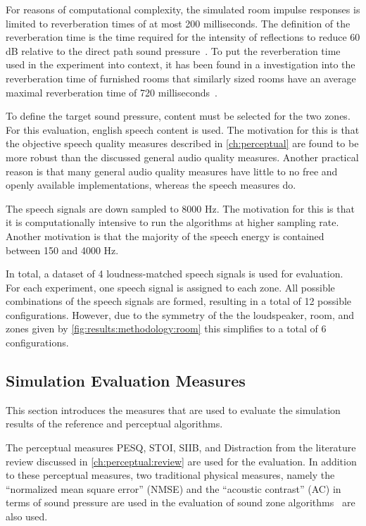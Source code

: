 For reasons of computational complexity, the simulated room impulse 
responses is limited to reverberation times of at most 200 milliseconds.
The definition of the reverberation time is the time required for the intensity of reflections to reduce 60 dB relative 
to the direct path sound pressure~\cite{habets2006room}. 
To put the reverberation time used in the experiment into context, 
it has been found in a investigation into the reverberation time of furnished rooms
that similarly sized rooms have an average maximal reverberation 
time of 720 milliseconds~\cite{diaz2005reverberation}.

To define the target sound pressure, content must be selected for the two zones.
For this evaluation, english speech content is used.
The motivation for this is that the objective speech quality measures described in 
\autoref{ch:perceptual} are found to be more robust than
the discussed general audio quality measures.
Another practical reason is that many general audio quality measures have 
little to no free and openly available implementations, whereas the speech measures do.

The speech signals are down sampled to 8000 Hz.
The motivation for this is that it is computationally intensive to run the algorithms at higher sampling rate.
Another motivation is that the majority of the speech energy is contained between 150 and 4000 Hz.

In total, a dataset of 4 loudness-matched speech signals is used for evaluation.
For each experiment, one speech signal is assigned to each zone.
All possible combinations of the speech signals are formed, resulting in a total of 12 possible configurations.
However, due to the symmetry of the the loudspeaker, room, and zones given by \autoref{fig:results:methodology:room} this simplifies to 
a total of 6 configurations.

\subsection{Simulation Evaluation Measures}
\label{ch:results:methodology:measures}
This section introduces the measures that are used to evaluate the simulation results 
of the reference and perceptual algorithms.

The perceptual measures PESQ, STOI, SIIB, and Distraction 
from the literature review discussed in \autoref{ch:perceptual:review} are used for the evaluation.
In addition to these perceptual measures, two traditional physical measures, namely the ``normalized mean square error'' (NMSE) and
the ``acoustic contrast'' (AC) in terms of sound pressure are used in the evaluation of 
sound zone algorithms~\cite{lee2018unified} are also used.

